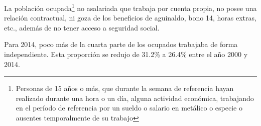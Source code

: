 La población ocupada\footnote{Personas de 15 años o más, que durante la semana de referencia hayan realizado durante una hora o un día, alguna actividad económica, trabajando en el período de referencia por un sueldo o salario en metálico o especie o ausentes temporalmente de su trabajo} no asalariada que trabaja por cuenta propia, no posee una relación contractual, ni goza de los beneficios de aguinaldo, bono 14, horas extras, etc., además de no tener acceso a seguridad social.

 Para 2014, poco más de la cuarta parte de los ocupados trabajaba de forma independiente. Esta proporción se redujo de 31.2\% a 26.4\% entre  el año 2000 y  2014.